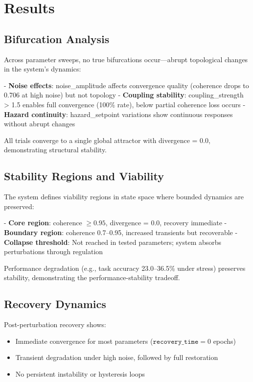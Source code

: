 \documentclass[12pt,a4paper]{article}
\begin{document}
\section{Results}

\subsection{Bifurcation Analysis}

Across parameter sweeps, no true bifurcations occur—abrupt topological changes in the system's dynamics:

- \textbf{Noise effects}: noise\_amplitude affects convergence quality (coherence drops to 0.706 at high noise) but not topology
- \textbf{Coupling stability}: coupling\_strength > 1.5 enables full convergence (100\% rate), below partial coherence loss occurs
- \textbf{Hazard continuity}: hazard\_setpoint variations show continuous responses without abrupt changes

All trials converge to a single global attractor with divergence = 0.0, demonstrating structural stability.

\subsection{Stability Regions and Viability}

The system defines viability regions in state space where bounded dynamics are preserved:

- \textbf{Core region}: coherence $\geq 0.95$, divergence = 0.0, recovery immediate
- \textbf{Boundary region}: coherence 0.7--0.95, increased transients but recoverable
- \textbf{Collapse threshold}: Not reached in tested parameters; system absorbs perturbations through regulation

Performance degradation (e.g., task accuracy 23.0--36.5\% under stress) preserves stability, demonstrating the performance-stability tradeoff.

\subsection{Recovery Dynamics}

Post-perturbation recovery shows:
\begin{itemize}
    \item Immediate convergence for most parameters ($\texttt{recovery\_time} = 0$ epochs)
    \item Transient degradation under high noise, followed by full restoration
    \item No persistent instability or hysteresis loops
\end{itemize}
\end{document}
